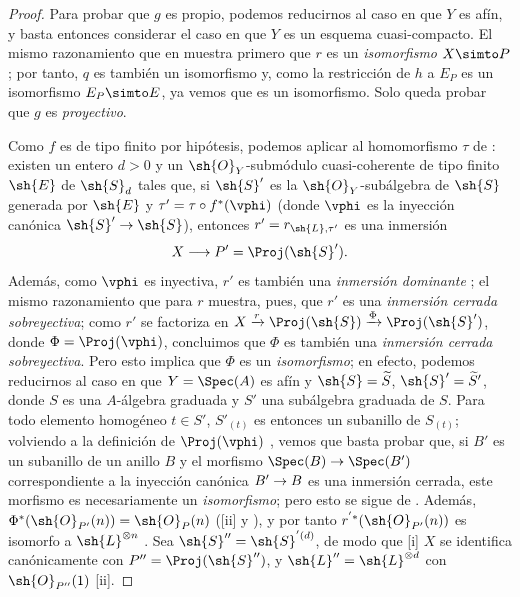 \documentclass[oneside,10pt]{amsart}
\makeatletter
\newcommand{\ega@arrow}[2]{\mathchoice{#1}{#2}{#2}{#2}}
\renewcommand{\to}{\ega@arrow{\longrightarrow}{\rightarrow}}
\newcommand{\oldpage}[2][]{\marginnote{\normalfont\footnotesize\textbf{#1}~|~#2}\ignorespaces}
\makeatother
\begin{document}
\begin{proof}
Para probar que $g$ es propio, podemos reducirnos al caso en que $Y$ es afín, y basta entonces considerar el caso en que $Y$ es un esquema cuasi-compacto.
El mismo razonamiento que en  muestra primero que $r$ es un \emph{isomorfismo} $X\simto P$;
por tanto, $q$ es también un isomorfismo y, como la restricción de $h$ a $E_P$ es un isomorfismo $E_P\simto E$, ya vemos que  es un isomorfismo.
Solo queda probar que $g$ es \emph{proyectivo}.

Como $f$ es de tipo finito por hipótesis, podemos aplicar  al homomorfismo
\oldpage[II]{180}
$\tau$ de :
existen un entero $d>0$ y un $\sh{O}_Y$-submódulo cuasi-coherente de tipo finito $\sh{E}$ de $\sh{S}_d$ tales que, si $\sh{S}'$ es la $\sh{O}_Y$-subálgebra de $\sh{S}$ generada por $\sh{E}$ y $\tau'=\tau\circ f^*(\vphi)$ (donde $\vphi$ es la inyección canónica $\sh{S}'\to\sh{S}$), entonces $r'=r_{\sh{L},\tau'}$ es una inmersión
\[
  X\to P'=\Proj(\sh{S}').
\]
Además, como $\vphi$ es inyectiva, $r'$ es también una \emph{inmersión dominante} ;
el mismo razonamiento que para $r$ muestra, pues, que $r'$ es una \emph{inmersión cerrada sobreyectiva};
como $r'$ se factoriza en $X\xrightarrow{r}\Proj(\sh{S})\xrightarrow{\Phi}\Proj(\sh{S}')$, donde $\Phi=\Proj(\vphi)$, concluimos que $\Phi$ es también una \emph{inmersión cerrada sobreyectiva}.
Pero esto implica que $\Phi$ es un \emph{isomorfismo};
en efecto, podemos reducirnos al caso en que $Y=\Spec(A)$ es afín y $\sh{S}=\widetilde{S}$, $\sh{S}'=\widetilde S'$, donde $S$ es una $A$-álgebra graduada y $S'$ una subálgebra graduada de $S$.
Para todo elemento homogéneo $t\in S'$, $S'_{(t)}$ es entonces un subanillo de $S_{(t)}$;
volviendo a la definición de $\Proj(\vphi)$ , vemos que basta probar que, si $B'$ es un subanillo de un anillo $B$ y el morfismo $\Spec(B)\to\Spec(B')$ correspondiente a la inyección canónica $B'\to B$ es una inmersión cerrada, este morfismo es necesariamente un \emph{isomorfismo};
pero esto se sigue de .
Además, $\Phi^*(\sh{O}_{P'}(n))=\sh{O}_P(n)$ ([ii] y ), y por tanto $r^{'*}(\sh{O}_{P'}(n))$ es isomorfo a $\sh{L}^{\otimes n}$ .
Sea $\sh{S}''=\sh{S}^{'(d)}$, de modo que [i] $X$ se identifica canónicamente con $P''=\Proj(\sh{S}'')$, y $\sh{L}''=\sh{L}^{\otimes d}$ con $\sh{O}_{P''}(1)$ [ii].


\end{proof}
\end{document}
